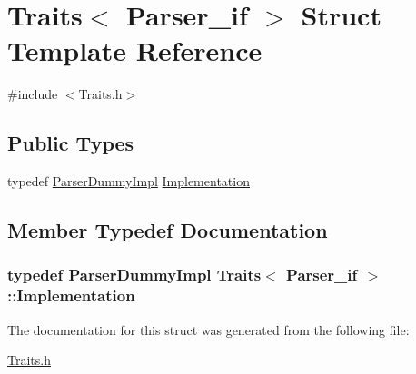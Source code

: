 \hypertarget{struct_traits_3_01_parser__if_01_4}{}\section{Traits$<$ Parser\+\_\+if $>$ Struct Template Reference}
\label{struct_traits_3_01_parser__if_01_4}


{\ttfamily \#include $<$Traits.\+h$>$}

\subsection*{Public Types}
\begin{DoxyCompactItemize}
\item 
typedef \hyperlink{class_parser_dummy_impl}{Parser\+Dummy\+Impl} \hyperlink{struct_traits_3_01_parser__if_01_4_a43a5402909afc5c2ed858133892ec60a}{Implementation}
\end{DoxyCompactItemize}


\subsection{Member Typedef Documentation}
\subsubsection[{\texorpdfstring{Implementation}{Implementation}}]{\setlength{\rightskip}{0pt plus 5cm}typedef {\bf Parser\+Dummy\+Impl} {\bf Traits}$<$ {\bf Parser\+\_\+if} $>$\+::{\bf Implementation}}\hypertarget{struct_traits_3_01_parser__if_01_4_a43a5402909afc5c2ed858133892ec60a}{}\label{struct_traits_3_01_parser__if_01_4_a43a5402909afc5c2ed858133892ec60a}


The documentation for this struct was generated from the following file\+:\begin{DoxyCompactItemize}
\item 
\hyperlink{_traits_8h}{Traits.\+h}\end{DoxyCompactItemize}
